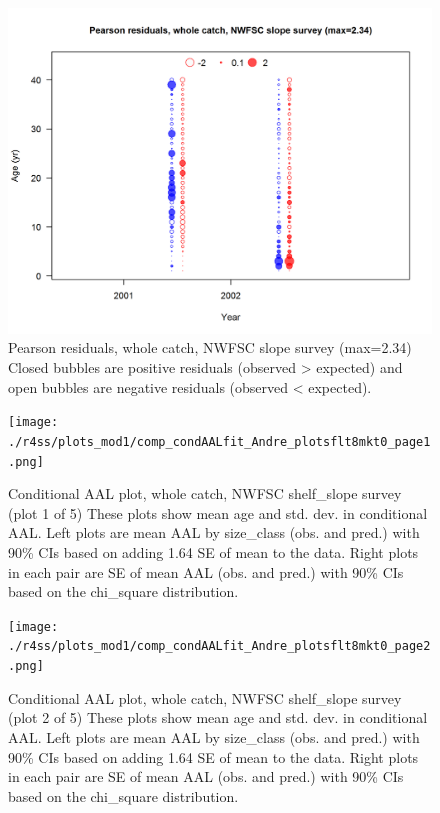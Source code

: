 \documentclass[12pt,]{article}
\begin{document}
\begin{figure}
\centering
\includegraphics{./r4ss/plots_mod1/comp_agefit_residsflt7mkt0.png}
\caption{Pearson residuals, whole catch, NWFSC slope survey (max=2.34)\\
Closed bubbles are positive residuals (observed \textgreater{} expected)
and open bubbles are negative residuals (observed \textless{} expected).
\label{fig:nwfsc_age_pearson}}
\end{figure}

\begin{figure}
\centering
\texttt{[image: ./r4ss/plots\_mod1/comp\_condAALfit\_Andre\_plotsflt8mkt0\_page1.png]}
\caption{Conditional AAL plot, whole catch, NWFSC shelf\_slope survey
(plot 1 of 5) These plots show mean age and std. dev. in conditional
AAL. Left plots are mean AAL by size\_class (obs. and pred.) with 90\%
CIs based on adding 1.64 SE of mean to the data. Right plots in each
pair are SE of mean AAL (obs. and pred.) with 90\% CIs based on the
chi\_square distribution. \label{fig:nwfsc_combo_andre_1}}
\end{figure}

\begin{figure}
\centering
\texttt{[image: ./r4ss/plots\_mod1/comp\_condAALfit\_Andre\_plotsflt8mkt0\_page2.png]}
\caption{Conditional AAL plot, whole catch, NWFSC shelf\_slope survey
(plot 2 of 5) These plots show mean age and std. dev. in conditional
AAL. Left plots are mean AAL by size\_class (obs. and pred.) with 90\%
CIs based on adding 1.64 SE of mean to the data. Right plots in each
pair are SE of mean AAL (obs. and pred.) with 90\% CIs based on the
chi\_square distribution. \label{fig:nwfsc_combo_andre_2}}
\end{figure}
\end{document}
